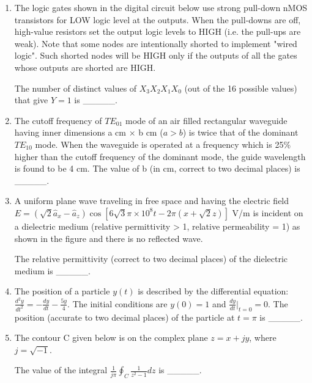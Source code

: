 \documentclass{article}
\begin{document}
\begin{enumerate}
\item The logic gates shown in the digital circuit below use strong pull-down nMOS transistors for LOW logic level at the outputs. When the pull-downs are off, high-value resistors set the output logic levels to HIGH (i.e. the pull-ups are weak). Note that some nodes are intentionally shorted to implement "wired logic". Such shorted nodes will be HIGH only if the outputs of all the gates whose outputs are shorted are HIGH.
\begin{figure}[H]
    \centering
    
    \caption{}
    \label{fig:q57}
\end{figure}
The number of distinct values of $X_3X_2X_1X_0$ (out of the 16 possible values) that give $Y = 1$ is \_\_\_\_\_.

\item The cutoff frequency of $TE_{01}$ mode of an air filled rectangular waveguide having inner dimensions a cm × b cm ($a > b$) is twice that of the dominant $TE_{10}$ mode. When the waveguide is operated at a frequency which is 25\% higher than the cutoff frequency of the dominant mode, the guide wavelength is found to be 4 cm. The value of b (in cm, correct to two decimal places) is \_\_\_\_\_.

\item A uniform plane wave traveling in free space and having the electric field
$E = (\sqrt{2}\hat{a}_x - \hat{a}_z) \cos[6\sqrt{3}\pi \times 10^8 t - 2\pi(x + \sqrt{2}z)]$ V/m
is incident on a dielectric medium (relative permittivity > 1, relative permeability = 1) as shown in the figure and there is no reflected wave.
\begin{figure}[H]
    \centering
    
    \caption{}
    \label{fig:q59}
\end{figure}
The relative permittivity (correct to two decimal places) of the dielectric medium is \_\_\_\_\_.

\item The position of a particle $y(t)$ is described by the differential equation:
$\frac{d^2y}{dt^2} = -\frac{dy}{dt} - \frac{5y}{4}$.
The initial conditions are $y(0) = 1$ and $\frac{dy}{dt}|_{t=0} = 0$. The position (accurate to two decimal places) of the particle at $t = \pi$ is \_\_\_\_\_.

\item The contour C given below is on the complex plane $z = x + jy$, where $j = \sqrt{-1}$.
\begin{figure}[H]
    \centering
    
    \caption{}
    \label{fig:q61}
\end{figure}
The value of the integral $\frac{1}{j\pi} \oint_C \frac{1}{z^2 - 1} dz$ is \_\_\_\_\_.


\end{enumerate}
\end{document}
